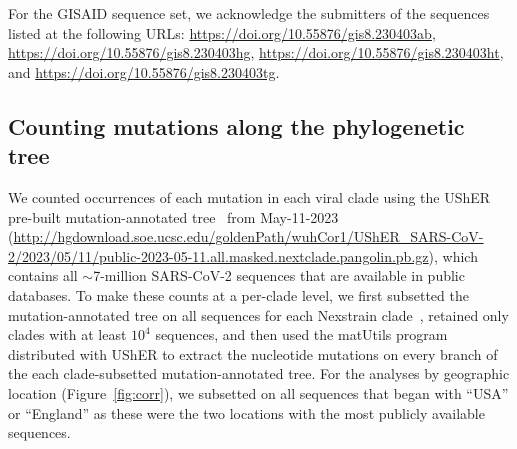\documentclass[9pt,twocolumn,twoside]{gsajnl_modified}
\begin{document}
{For the GISAID sequence set, we acknowledge the submitters of the sequences listed at the following URLs: \url{https://doi.org/10.55876/gis8.230403ab}, \url{https://doi.org/10.55876/gis8.230403hg}, \url{https://doi.org/10.55876/gis8.230403ht}, and \url{https://doi.org/10.55876/gis8.230403tg}.

\subsection{Counting mutations along the phylogenetic tree}
We counted occurrences of each mutation in each viral clade using the UShER pre-built mutation-annotated tree~\citep{mcbroome2021daily,turakhia2021ultrafast,lanfear2020} from May-11-2023 (\url{http://hgdownload.soe.ucsc.edu/goldenPath/wuhCor1/UShER_SARS-CoV-2/2023/05/11/public-2023-05-11.all.masked.nextclade.pangolin.pb.gz}), which contains all $\sim$7-million SARS-CoV-2 sequences that are available in public databases.
To make these counts at a per-clade level, we first subsetted the mutation-annotated tree on all sequences for each Nexstrain clade~\citep{aksamentov2021nextclade}, retained only clades with at least $10^4$ sequences, and then used the matUtils program distributed with UShER to extract the nucleotide mutations on every branch of the each clade-subsetted mutation-annotated tree.
For the analyses by geographic location (Figure~\ref{fig:corr}), we subsetted on all sequences that began with ``USA'' or ``England'' as these were the two locations with the most publicly available sequences.

}
\end{document}
